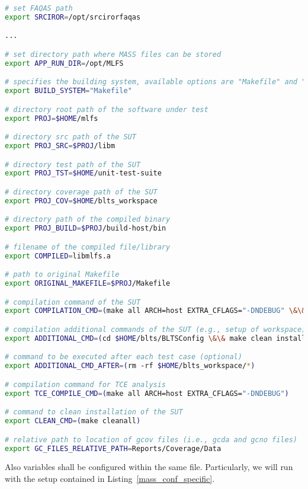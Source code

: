 \begin{lstlisting}[language=bash, label=mass_conf_single, caption=\MASS variables. Excerpt of mass\_conf.sh file.]
# set FAQAS path
export SRCIROR=/opt/srcirorfaqas

...

# set directory path where MASS files can be stored
export APP_RUN_DIR=/opt/MLFS

# specifies the building system, available options are "Makefile" and "waf"
export BUILD_SYSTEM="Makefile"

# directory root path of the software under test
export PROJ=$HOME/mlfs

# directory src path of the SUT
export PROJ_SRC=$PROJ/libm

# directory test path of the SUT
export PROJ_TST=$HOME/unit-test-suite

# directory coverage path of the SUT
export PROJ_COV=$HOME/blts_workspace

# directory path of the compiled binary
export PROJ_BUILD=$PROJ/build-host/bin

# filename of the compiled file/library
export COMPILED=libmlfs.a

# path to original Makefile
export ORIGINAL_MAKEFILE=$PROJ/Makefile

# compilation command of the SUT
export COMPILATION_CMD=(make all ARCH=host EXTRA_CFLAGS="-DNDEBUG" \&\& make all COVERAGE="true" ARCH=host_cov EXTRA_CFLAGS="-DNDEBUG")

# compilation additional commands of the SUT (e.g., setup of workspace)
export ADDITIONAL_CMD=(cd $HOME/blts/BLTSConfig \&\& make clean install INSTALL_PATH="$HOME/blts_install" \&\& cd $HOME/blts_workspace \&\& $HOME/blts_install/bin/blts_app --init)

# command to be executed after each test case (optional)
export ADDITIONAL_CMD_AFTER=(rm -rf $HOME/blts_workspace/*)

# compilation command for TCE analysis
export TCE_COMPILE_CMD=(make all ARCH=host EXTRA_CFLAGS="-DNDEBUG")

# command to clean installation of the SUT
export CLEAN_CMD=(make cleanall)

# relative path to location of gcov files (i.e., gcda and gcno files)
export GC_FILES_RELATIVE_PATH=Reports/Coverage/Data
\end{lstlisting}

Also \MASS variables shall be configured within the same file. Particularly, we will run \MASS with the setup contained in Listing~\ref{mass_conf_specific}.

